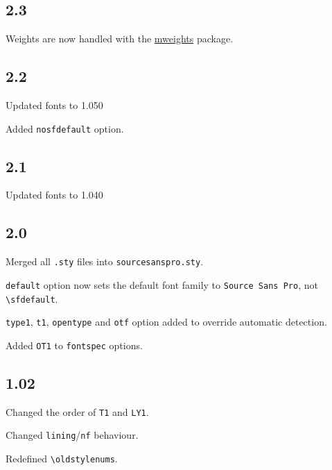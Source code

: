 \documentclass[10pt,a4paper,english]{article}
\begin{document}
\begin{multicols}{2}
\subsection*{2.3}
\begin{itemize*}
	\item Weights are now handled with the \href{http://www.ctan.org/pkg/mweights}{mweights} package.
\end{itemize*}

\subsection*{2.2}
\begin{itemize*}
	\item Updated fonts to 1.050
	\item Added \texttt{nosfdefault} option.
\end{itemize*}

\subsection*{2.1}
\begin{itemize*}
	\item Updated fonts to 1.040
\end{itemize*}

\subsection*{2.0}
\begin{itemize*}
	\item Merged all \texttt{.sty} files into \texttt{sourcesanspro.sty}.
	\item \texttt{default} option now sets the default font family to \texttt{Source Sans Pro}, not \texttt{\textbackslash sfdefault}.
	\item \texttt{type1}, \texttt{t1}, \texttt{opentype} and \texttt{otf} option added to override automatic detection.
	\item Added \texttt{OT1} to \texttt{fontspec} options.
\end{itemize*}

\subsection*{1.02}
\begin{itemize*}
	\item Changed the order of \texttt{T1} and \texttt{LY1}.
	\item Changed \texttt{lining}/\texttt{nf} behaviour.
	\item Redefined \texttt{\textbackslash oldstylenums}.
\end{itemize*}


\end{multicols}
\end{document}
